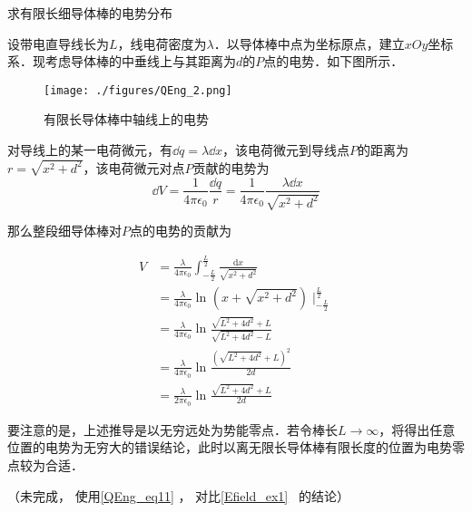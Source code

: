 \begin{example}{求有限长细导体棒的电势分布}

设带电直导线长为$L$，线电荷密度为$\lambda$．以导体棒中点为坐标原点，建立$xOy$坐标系．现考虑导体棒的中垂线上与其距离为$d$的$P$点的电势．如下图所示．

\begin{figure}[ht]
\centering
\texttt{[image: ./figures/QEng\_2.png]}
\caption{有限长导体棒中轴线上的电势} \label{QEng_fig2}
\end{figure}

对导线上的某一电荷微元，有$\dd q=\lambda \dd x$，该电荷微元到导线点$P$的距离为$r=\sqrt{x^2+d^2}$，该电荷微元对点$P$贡献的电势为
\begin{equation}
\dd V=\frac{1}{4\pi \epsilon_0}\frac{\dd q}{r}=\frac{1}{4\pi \epsilon_0}\frac{\lambda \dd x}{\sqrt{x^2+d^2}}
\end{equation}

那么整段细导体棒对$P$点的电势的贡献为

\begin{equation}
\begin{aligned}
V &=\frac{\lambda }{4 \pi \epsilon_{0}}\int_{-\frac{L}{2}}^{\frac{L}{2}}\frac{\mathrm{d} x}{\sqrt{x^{2}+d^{2}}}\\
&=\frac{\lambda }{4 \pi \epsilon_{0}}\ln_{}{(x+\sqrt{x^2+d^2})}\mid_{-\frac{L}{2}}^{\frac{L}{2}}\\
&=\frac{\lambda }{4 \pi \epsilon_{0}}\ln_{}{\frac{\sqrt{L^2+4d^2}+L}{\sqrt{L^2+4d^2}-L}}\\
&=\frac{\lambda }{4 \pi \epsilon_{0}}\ln_{}{\frac{(\sqrt{L^2+4d^2}+L)^2}{2d}}\\
&=\frac{\lambda }{2 \pi \epsilon_{0}}\ln_{}{\frac{\sqrt{L^2+4d^2}+L}{2d}}
\end{aligned}
\end{equation}


要注意的是，上述推导是以无穷远处为势能零点．若令棒长$L\rightarrow \infty$，将得出任意位置的电势为无穷大的错误结论，此时以离无限长导体棒有限长度的位置为电势零点较为合适．

（未完成， 使用\autoref{QEng_eq11} ， 对比\autoref{Efield_ex1}~ 的结论）

\end{example}

